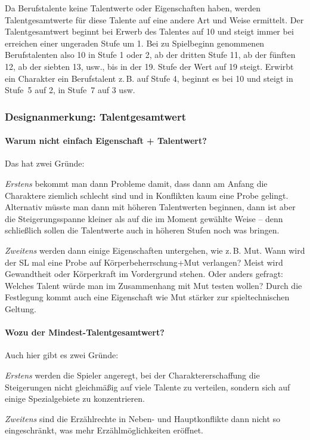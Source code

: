 Da Berufstalente keine Talentwerte oder Eigenschaften haben, werden Talentgesamtwerte für diese Talente auf eine andere Art und Weise ermittelt. Der Talentgesamtwert beginnt bei Erwerb des Talentes auf 10 und steigt immer bei erreichen einer ungeraden Stufe um 1. Bei zu Spielbeginn genommenen Berufstalenten also 10 in Stufe 1 oder 2, ab der dritten Stufe 11, ab der fünften 12, ab der siebten 13, usw., bis in der 19. Stufe der Wert auf 19 steigt. Erwirbt ein Charakter ein Berufstalent z.\,B. auf Stufe 4, beginnt es bei 10 und steigt in Stufe~5 auf 2, in Stufe~7 auf 3 usw.

\begin{design}
\subsubsection{Designanmerkung: Talentgesamtwert}

\paragraph{Warum nicht einfach Eigenschaft + Talentwert?} Das hat zwei Gründe:

\emph{Erstens} bekommt man dann Probleme damit, dass dann am Anfang die Charaktere ziemlich schlecht sind und in Konflikten kaum eine Probe gelingt. Alternativ müsste man dann mit höheren Talentwerten beginnen, dann ist aber die Steigerungsspanne kleiner als auf die im Moment gewählte Weise -- denn schließlich sollen die Talentwerte auch in höheren Stufen noch was bringen.

\emph{Zweitens} werden dann einige Eigenschaften untergehen, wie z.\,B. Mut. Wann wird der SL mal eine Probe auf Körperbeherrschung+Mut verlangen? Meist wird Gewandtheit oder Körperkraft im Vordergrund stehen. Oder anders gefragt: Welches Talent würde man im Zusammenhang mit Mut testen wollen? Durch die Festlegung kommt auch eine Eigenschaft wie Mut stärker zur spieltechnischen Geltung.

\paragraph{Wozu der Mindest-Talentgesamtwert?} Auch hier gibt es zwei Gründe:

\emph{Erstens} werden die Spieler angeregt, bei der Charaktererschaffung die Steigerungen nicht gleichmäßig auf viele Talente zu verteilen, sondern sich auf einige Spezialgebiete zu konzentrieren.

\emph{Zweitens} sind die Erzählrechte in Neben- und Hauptkonflikte dann nicht so eingeschränkt, was mehr Erzählmöglichkeiten eröffnet. 
\end{design}




